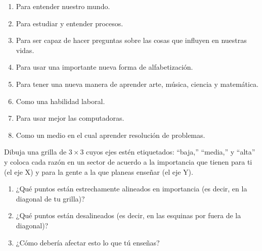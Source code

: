 \begin{enumerate}

\item
 Para entender nuestro mundo.

\item
 Para estudiar y entender procesos.

\item
 Para ser capaz de hacer preguntas sobre las cosas que influyen en nuestras vidas.

\item
Para usar una importante nueva forma de alfabetización.

\item
 Para tener una nueva manera de aprender arte, música, ciencia y matemática.

\item
 Como una habilidad laboral.

\item
 Para usar mejor las computadoras. 

\item
 Como un medio en el cual aprender resolución de problemas.

\end{enumerate}

Dibuja una grilla de $3{\times}3$ cuyos ejes estén etiquetados: ``baja,'' ``media,'' y ``alta''
y coloca cada razón en un sector
de acuerdo a la importancia que tienen para ti (el eje X)
y para la gente a la que planeas enseñar (el eje Y).

\begin{enumerate}

\item
 ¿Qué puntos están estrechamente alineados en importancia
 (es decir, en la diagonal de tu grilla)?

\item
¿Qué puntos están desalineados
 (es decir, en las esquinas por fuera de la diagonal)?

\item
 ¿Cómo debería afectar esto lo que tú enseñas?

\end{enumerate}
